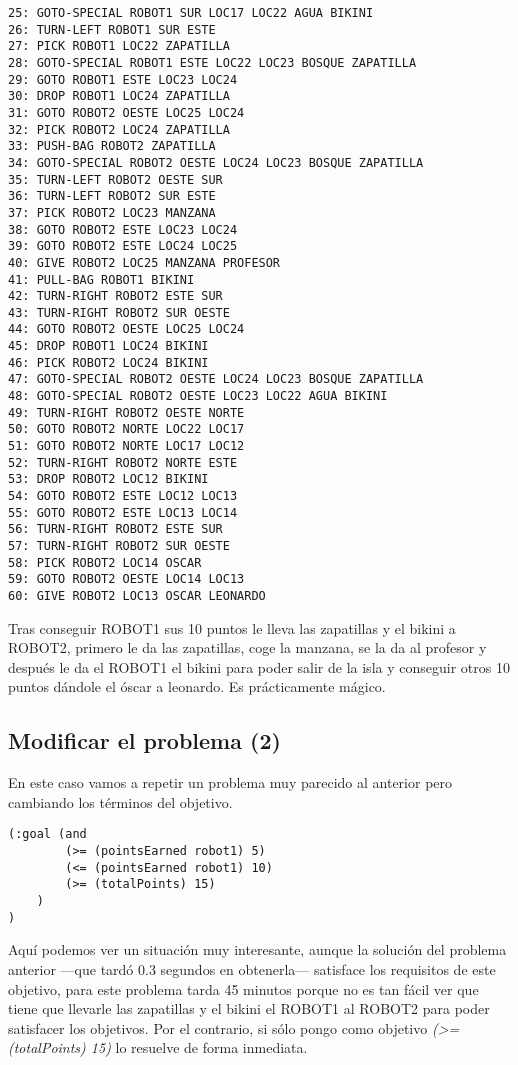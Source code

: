 \documentclass{article}
\begin{document}
\begin{lstlisting}
25: GOTO-SPECIAL ROBOT1 SUR LOC17 LOC22 AGUA BIKINI
26: TURN-LEFT ROBOT1 SUR ESTE
27: PICK ROBOT1 LOC22 ZAPATILLA
28: GOTO-SPECIAL ROBOT1 ESTE LOC22 LOC23 BOSQUE ZAPATILLA
29: GOTO ROBOT1 ESTE LOC23 LOC24
30: DROP ROBOT1 LOC24 ZAPATILLA
31: GOTO ROBOT2 OESTE LOC25 LOC24
32: PICK ROBOT2 LOC24 ZAPATILLA
33: PUSH-BAG ROBOT2 ZAPATILLA
34: GOTO-SPECIAL ROBOT2 OESTE LOC24 LOC23 BOSQUE ZAPATILLA
35: TURN-LEFT ROBOT2 OESTE SUR
36: TURN-LEFT ROBOT2 SUR ESTE
37: PICK ROBOT2 LOC23 MANZANA
38: GOTO ROBOT2 ESTE LOC23 LOC24
39: GOTO ROBOT2 ESTE LOC24 LOC25
40: GIVE ROBOT2 LOC25 MANZANA PROFESOR
41: PULL-BAG ROBOT1 BIKINI
42: TURN-RIGHT ROBOT2 ESTE SUR
43: TURN-RIGHT ROBOT2 SUR OESTE
44: GOTO ROBOT2 OESTE LOC25 LOC24
45: DROP ROBOT1 LOC24 BIKINI
46: PICK ROBOT2 LOC24 BIKINI
47: GOTO-SPECIAL ROBOT2 OESTE LOC24 LOC23 BOSQUE ZAPATILLA
48: GOTO-SPECIAL ROBOT2 OESTE LOC23 LOC22 AGUA BIKINI
49: TURN-RIGHT ROBOT2 OESTE NORTE
50: GOTO ROBOT2 NORTE LOC22 LOC17
51: GOTO ROBOT2 NORTE LOC17 LOC12
52: TURN-RIGHT ROBOT2 NORTE ESTE
53: DROP ROBOT2 LOC12 BIKINI
54: GOTO ROBOT2 ESTE LOC12 LOC13
55: GOTO ROBOT2 ESTE LOC13 LOC14
56: TURN-RIGHT ROBOT2 ESTE SUR
57: TURN-RIGHT ROBOT2 SUR OESTE
58: PICK ROBOT2 LOC14 OSCAR
59: GOTO ROBOT2 OESTE LOC14 LOC13
60: GIVE ROBOT2 LOC13 OSCAR LEONARDO
\end{lstlisting}

Tras conseguir ROBOT1 sus 10 puntos le lleva las zapatillas y el bikini a ROBOT2, primero le da las zapatillas, coge la manzana, se la da al profesor y después le da el ROBOT1 el bikini para poder salir de la isla y conseguir otros 10 puntos dándole el óscar a leonardo. Es prácticamente mágico.

\subsection{Modificar el problema (2)}

En este caso vamos a repetir un problema muy parecido al anterior pero cambiando los términos del objetivo.

\begin{lstlisting}
(:goal (and
        (>= (pointsEarned robot1) 5)
        (<= (pointsEarned robot1) 10)
        (>= (totalPoints) 15)
    )
)
\end{lstlisting}

Aquí podemos ver un situación muy interesante, aunque la solución del problema anterior ---que tardó 0.3 segundos en obtenerla--- satisface los requisitos de este objetivo, para este problema tarda 45 minutos porque no es tan fácil ver que tiene que llevarle las zapatillas y el bikini el ROBOT1 al ROBOT2 para poder satisfacer los objetivos. Por el contrario, si sólo pongo como objetivo \emph{(>= (totalPoints) 15)} lo resuelve de forma inmediata.
\end{document}
